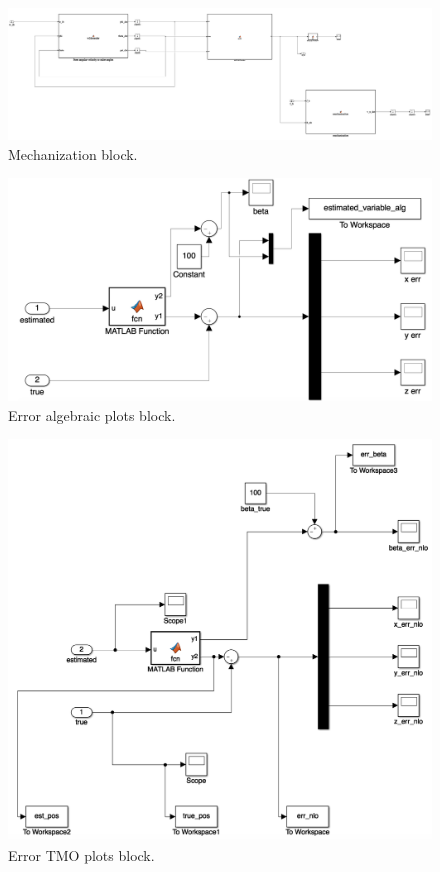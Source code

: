 \documentclass{article}
\begin{document}
\begin{figure}
    \centering
    \includegraphics[angle=90,scale = 0.5]{mechanization_scheme.png}
    \caption{Mechanization block.}
    \label{fig:f5}
\end{figure}



\begin{figure}
    \centering
    \includegraphics[angle=90,scale = 0.5]{plot_error_algebraic.png}
    \caption{Error algebraic plots block.}
    \label{fig:f6}
\end{figure}

\begin{figure}
    \centering
    \includegraphics[angle=90,scale = 0.5]{plot_error_TMO.png}
    \caption{Error TMO plots block.}
    \label{fig:f7}
\end{figure}
\end{document}
